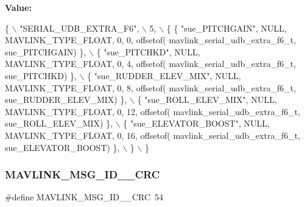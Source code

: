 {\bfseries Value\+:}
\begin{DoxyCode}
\{ \(\backslash\)
    \textcolor{stringliteral}{"SERIAL\_UDB\_EXTRA\_F6"}, \(\backslash\)
    5, \(\backslash\)
    \{  \{ \textcolor{stringliteral}{"sue\_PITCHGAIN"}, NULL, MAVLINK_TYPE_FLOAT, 0, 0, offsetof(
      mavlink_serial_udb_extra_f6_t, sue\_PITCHGAIN) \}, \(\backslash\)
         \{ \textcolor{stringliteral}{"sue\_PITCHKD"}, NULL, MAVLINK_TYPE_FLOAT, 0, 4, offsetof(
      mavlink_serial_udb_extra_f6_t, sue\_PITCHKD) \}, \(\backslash\)
         \{ \textcolor{stringliteral}{"sue\_RUDDER\_ELEV\_MIX"}, NULL, MAVLINK_TYPE_FLOAT, 0, 8, offsetof(
      mavlink_serial_udb_extra_f6_t, sue\_RUDDER\_ELEV\_MIX) \}, \(\backslash\)
         \{ \textcolor{stringliteral}{"sue\_ROLL\_ELEV\_MIX"}, NULL, MAVLINK_TYPE_FLOAT, 0, 12, offsetof(
      mavlink_serial_udb_extra_f6_t, sue\_ROLL\_ELEV\_MIX) \}, \(\backslash\)
         \{ \textcolor{stringliteral}{"sue\_ELEVATOR\_BOOST"}, NULL, MAVLINK_TYPE_FLOAT, 0, 16, offsetof(
      mavlink_serial_udb_extra_f6_t, sue\_ELEVATOR\_BOOST) \}, \(\backslash\)
         \} \(\backslash\)
\}
\end{DoxyCode}
\mbox{\label{mavlink__msg__serial__udb__extra__f6_8h_ae47d6195c8b5a9084b2c623f5e8a7677}} 
\subsubsection{M\+A\+V\+L\+I\+N\+K\+\_\+\+M\+S\+G\+\_\+\+I\+D\+\_\+\_\+\+C\+RC}
{\footnotesize\ttfamily \#define M\+A\+V\+L\+I\+N\+K\+\_\+\+M\+S\+G\+\_\+\+I\+D\+\_\+\_\+\+C\+RC~54}

\mbox{\label{mavlink__msg__serial__udb__extra__f6_8h_a1c1010884f7935f9d0636b90b67e0213}} 
